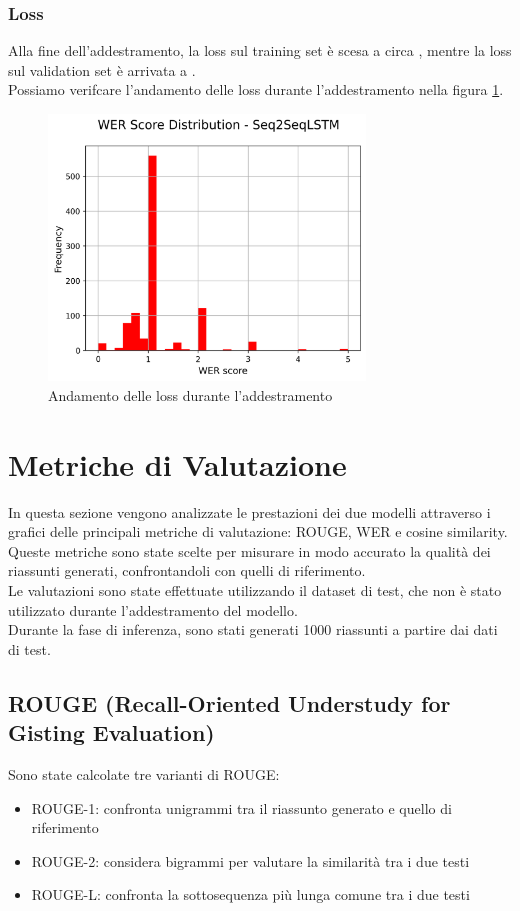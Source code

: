 \documentclass[a4paper, 12pt]{article}
\begin{document}
\subsubsection{Loss}
Alla fine dell'addestramento, la loss sul training set è scesa a circa , mentre la loss sul validation set è arrivata a .\\
Possiamo verifcare l'andamento delle loss durante l'addestramento nella figura \ref{fig:loss_plot}.
\begin{figure}[H]
    \centering
    \includegraphics[width=0.75\textwidth]{media/Seq2SeqLSTM_wer_scores.png}
    \caption{Andamento delle loss durante l'addestramento}
    \label{fig:loss_plot}
\end{figure}

\section{Metriche di Valutazione}
In questa sezione vengono analizzate le prestazioni dei due modelli attraverso i grafici delle principali metriche di valutazione: ROUGE, WER e cosine similarity. 
Queste metriche sono state scelte per misurare in modo accurato la qualità dei riassunti generati, confrontandoli con quelli di riferimento.\\
Le valutazioni sono state effettuate utilizzando il dataset di test, che non è stato utilizzato durante l'addestramento del modello.\\
Durante la fase di inferenza, sono stati generati 1000 riassunti a partire dai dati di test.

\subsection{ROUGE (Recall-Oriented Understudy for Gisting Evaluation)}
Sono state calcolate tre varianti di ROUGE:
\begin{itemize}
    \item ROUGE-1: confronta unigrammi tra il riassunto generato e quello di riferimento
    \item ROUGE-2: considera bigrammi per valutare la similarità tra i due testi
    \item ROUGE-L: confronta la sottosequenza più lunga comune tra i due testi
\end{itemize}    
\end{document}
